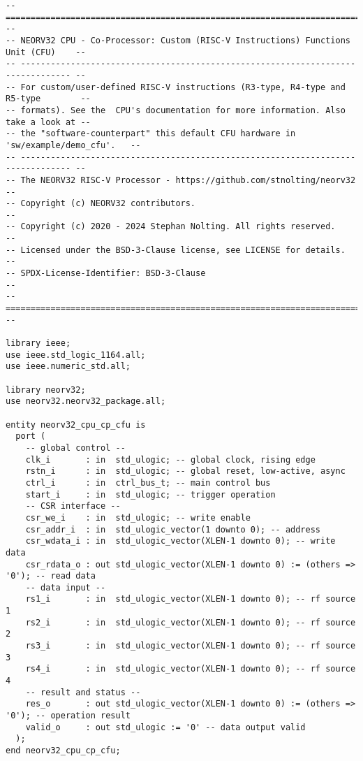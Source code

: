 \begin{code}
\begin{verbatim}
-- ================================================================================ --
-- NEORV32 CPU - Co-Processor: Custom (RISC-V Instructions) Functions Unit (CFU)    --
-- -------------------------------------------------------------------------------- --
-- For custom/user-defined RISC-V instructions (R3-type, R4-type and R5-type        --
-- formats). See the  CPU's documentation for more information. Also take a look at --
-- the "software-counterpart" this default CFU hardware in 'sw/example/demo_cfu'.   --
-- -------------------------------------------------------------------------------- --
-- The NEORV32 RISC-V Processor - https://github.com/stnolting/neorv32              --
-- Copyright (c) NEORV32 contributors.                                              --
-- Copyright (c) 2020 - 2024 Stephan Nolting. All rights reserved.                  --
-- Licensed under the BSD-3-Clause license, see LICENSE for details.                --
-- SPDX-License-Identifier: BSD-3-Clause                                            --
-- ================================================================================ --

library ieee;
use ieee.std_logic_1164.all;
use ieee.numeric_std.all;

library neorv32;
use neorv32.neorv32_package.all;

entity neorv32_cpu_cp_cfu is
  port (
    -- global control --
    clk_i       : in  std_ulogic; -- global clock, rising edge
    rstn_i      : in  std_ulogic; -- global reset, low-active, async
    ctrl_i      : in  ctrl_bus_t; -- main control bus
    start_i     : in  std_ulogic; -- trigger operation
    -- CSR interface --
    csr_we_i    : in  std_ulogic; -- write enable
    csr_addr_i  : in  std_ulogic_vector(1 downto 0); -- address
    csr_wdata_i : in  std_ulogic_vector(XLEN-1 downto 0); -- write data
    csr_rdata_o : out std_ulogic_vector(XLEN-1 downto 0) := (others => '0'); -- read data
    -- data input --
    rs1_i       : in  std_ulogic_vector(XLEN-1 downto 0); -- rf source 1
    rs2_i       : in  std_ulogic_vector(XLEN-1 downto 0); -- rf source 2
    rs3_i       : in  std_ulogic_vector(XLEN-1 downto 0); -- rf source 3
    rs4_i       : in  std_ulogic_vector(XLEN-1 downto 0); -- rf source 4
    -- result and status --
    res_o       : out std_ulogic_vector(XLEN-1 downto 0) := (others => '0'); -- operation result
    valid_o     : out std_ulogic := '0' -- data output valid
  );
end neorv32_cpu_cp_cfu;


\end{verbatim}
\end{code}
